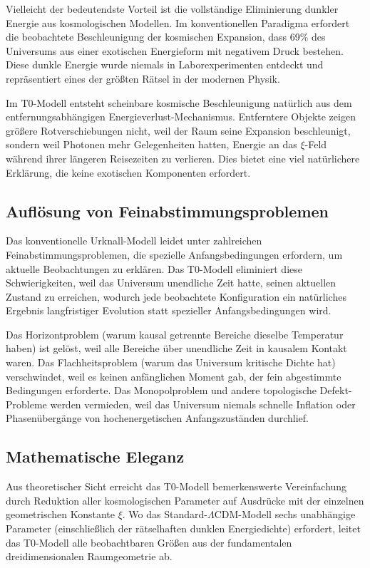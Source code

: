 	Vielleicht der bedeutendste Vorteil ist die vollständige Eliminierung dunkler Energie aus kosmologischen Modellen. Im konventionellen Paradigma erfordert die beobachtete Beschleunigung der kosmischen Expansion, dass 69\% des Universums aus einer exotischen Energieform mit negativem Druck bestehen. Diese dunkle Energie wurde niemals in Laborexperimenten entdeckt und repräsentiert eines der größten Rätsel in der modernen Physik.
	
	Im T0-Modell entsteht scheinbare kosmische Beschleunigung natürlich aus dem entfernungsabhängigen Energieverlust-Mechanismus. Entferntere Objekte zeigen größere Rotverschiebungen nicht, weil der Raum seine Expansion beschleunigt, sondern weil Photonen mehr Gelegenheiten hatten, Energie an das $\xi$-Feld während ihrer längeren Reisezeiten zu verlieren. Dies bietet eine viel natürlichere Erklärung, die keine exotischen Komponenten erfordert.
	
	\subsection{Auflösung von Feinabstimmungsproblemen}
	
	Das konventionelle Urknall-Modell leidet unter zahlreichen Feinabstimmungsproblemen, die spezielle Anfangsbedingungen erfordern, um aktuelle Beobachtungen zu erklären. Das T0-Modell eliminiert diese Schwierigkeiten, weil das Universum unendliche Zeit hatte, seinen aktuellen Zustand zu erreichen, wodurch jede beobachtete Konfiguration ein natürliches Ergebnis langfristiger Evolution statt spezieller Anfangsbedingungen wird.
	
	Das Horizontproblem (warum kausal getrennte Bereiche dieselbe Temperatur haben) ist gelöst, weil alle Bereiche über unendliche Zeit in kausalem Kontakt waren. Das Flachheitsproblem (warum das Universum kritische Dichte hat) verschwindet, weil es keinen anfänglichen Moment gab, der fein abgestimmte Bedingungen erforderte. Das Monopolproblem und andere topologische Defekt-Probleme werden vermieden, weil das Universum niemals schnelle Inflation oder Phasenübergänge von hochenergetischen Anfangszuständen durchlief.
	
	\subsection{Mathematische Eleganz}
	
	Aus theoretischer Sicht erreicht das T0-Modell bemerkenswerte Vereinfachung durch Reduktion aller kosmologischen Parameter auf Ausdrücke mit der einzelnen geometrischen Konstante $\xi$. Wo das Standard-$\Lambda$CDM-Modell sechs unabhängige Parameter (einschließlich der rätselhaften dunklen Energiedichte) erfordert, leitet das T0-Modell alle beobachtbaren Größen aus der fundamentalen dreidimensionalen Raumgeometrie ab.
	
